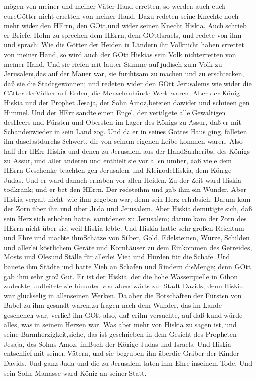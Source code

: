 mögen von meiner und meiner Väter Hand erretten, so werden auch euch
eureGötter nicht erretten von meiner Hand.  Dazu redeten
seine Knechte noch mehr wider den HErrn, den GOtt,und wider seinen
Knecht Hiskia.  Auch schrieb er Briefe, Hohn zu sprechen
dem HErrn, dem GOttIsraels, und redete von ihm und sprach: Wie die
Götter der Heiden in Ländern ihr Volknicht haben errettet von meiner
Hand, so wird auch der GOtt Hiskias sein Volk nichterretten von meiner
Hand.  Und sie riefen mit lauter Stimme auf jüdisch zum
Volk zu Jerusalem,das auf der Mauer war, sie furchtsam zu machen und zu
erschrecken, daß sie die Stadtgewönnen;  und redeten wider
den GOtt Jerusalems wie wider die Götter derVölker auf Erden, die
Menschenhände-Werk waren.  Aber der König Hiskia und der
Prophet Jesaja, der Sohn Amoz,beteten dawider und schrieen gen Himmel.
 Und der HErr sandte einen Engel, der vertilgete alle
Gewaltigen desHeers und Fürsten und Obersten im Lager des Königs zu
Assur, daß er mit Schandenwieder in sein Land zog. Und da er in seines
Gottes Haus ging, fälleten ihn daselbstdurchs Schwert, die von seinem
eigenen Leibe kommen waren.  Also half der HErr Hiskia und
denen zu Jerusalem aus der HandSanheribs, des Königs zu Assur, und aller
anderen und enthielt sie vor allen umher,  daß viele dem
HErrn Geschenke brachten gen Jerusalem und KleinodeHiskia, dem Könige
Judas. Und er ward danach erhaben vor allen Heiden.  Zu der
Zeit ward Hiskia todkrank; und er bat den HErrn. Der redeteihm und gab
ihm ein Wunder.  Aber Hiskia vergalt nicht, wie ihm gegeben
war; denn sein Herz erhubsich. Darum kam der Zorn über ihn und über Juda
und Jerusalem.  Aber Hiskia demütigte sich, daß sein Herz
sich erhoben hatte, samtdenen zu Jerusalem; darum kam der Zorn des HErrn
nicht über sie, weil Hiskia lebte.  Und Hiskia hatte sehr
großen Reichtum und Ehre und machte ihmSchätze von Silber, Gold,
Edelsteinen, Würze, Schilden und allerlei köstlichem Geräte
 und Kornhäuser zu dem Einkommen des Getreides, Mosts und
Ölesund Ställe für allerlei Vieh und Hürden für die Schafe.
 Und bauete ihm Städte und hatte Vieh an Schafen und
Rindern dieMenge; denn GOtt gab ihm sehr groß Gut.  Er ist
der Hiskia, der die hohe Wasserquelle in Gihon zudeckte undleitete sie
hinunter von abendwärts zur Stadt Davids; denn Hiskia war glückselig in
allenseinen Werken.  Da aber die Botschaften der Fürsten
von Babel zu ihm gesandt waren,zu fragen nach dem Wunder, das im Lande
geschehen war, verließ ihn GOtt also, daß erihn versuchte, auf daß kund
würde alles, was in seinem Herzen war.  Was aber mehr von
Hiskia zu sagen ist, und seine Barmherzigkeit,siehe, das ist geschrieben
in dem Gesicht des Propheten Jesaja, des Sohns Amoz, imBuch der Könige
Judas und Israels.  Und Hiskia entschlief mit seinen
Vätern, und sie begruben ihn überdie Gräber der Kinder Davids. Und ganz
Juda und die zu Jerusalem taten ihm Ehre inseinem Tode. Und sein Sohn
Manasse ward König an seiner Statt.

